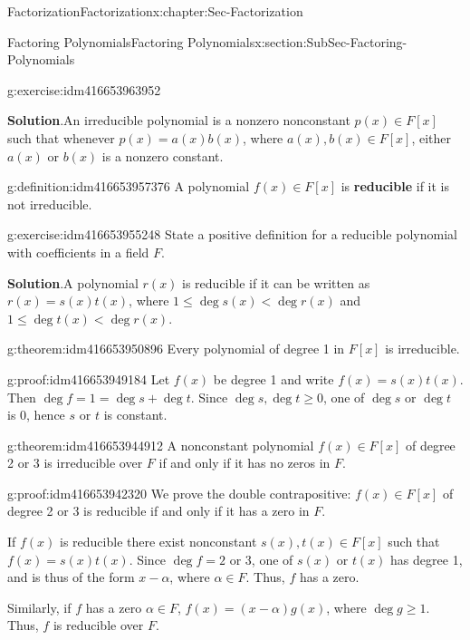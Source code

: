 \documentclass[oneside,10pt,]{book}
\newcommand{\terminology}[1]{\textbf{#1}}
\numberwithin{equation}{section}
\renewcommand{\le}{\leqslant}
\renewcommand{\ge}{\geqslant}
\newcommand{\lt}{<}
\begin{document}
\begin{chapterptx}{Factorization}{}{Factorization}{}{}{x:chapter:Sec-Factorization}
\begin{sectionptx}{Factoring Polynomials}{}{Factoring Polynomials}{}{}{x:section:SubSec-Factoring-Polynomials}
\begin{inlineexercise}{}{g:exercise:idm416653963952}
\par\smallskip%
\noindent\textbf{Solution}.\hypertarget{g:solution:idm416653960608}{}\quad{}An irreducible polynomial is a nonzero nonconstant \(p(x)\in F[x]\) such that whenever \(p(x) = a(x) b(x)\), where \(a(x), b(x) \in F[x]\), either \(a(x)\) or \(b(x)\) is a nonzero constant.%
\end{inlineexercise}
\begin{definition}{}{g:definition:idm416653957376}%
A polynomial \(f(x)\in F[x]\) is \terminology{reducible} if it is not irreducible.%
\end{definition}
\begin{inlineexercise}{}{g:exercise:idm416653955248}%
State a positive definition for a reducible polynomial with coefficients in a field \(F\).%
\par\smallskip%
\noindent\textbf{Solution}.\hypertarget{g:solution:idm416653953648}{}\quad{}A polynomial \(r(x)\) is reducible if it can be written as \(r(x) = s(x) t(x)\), where \(1 \le \deg s(x) \lt \deg r(x)\) and \(1 \le \deg t(x) \lt \deg r(x)\).%
\end{inlineexercise}
\begin{theorem}{}{}{g:theorem:idm416653950896}%
Every polynomial of degree 1 in \(F[x]\) is irreducible.%
\end{theorem}
\begin{proofptx}{}{g:proof:idm416653949184}
Let \(f(x)\) be degree 1 and write \(f(x) = s(x) t(x)\). Then \(\deg f = 1 = \deg s + \deg t\). Since \(\deg s, \deg t \ge 0\), one of \(\deg s\) or \(\deg t\) is 0, hence \(s\) or \(t\) is constant.%
\end{proofptx}
\begin{theorem}{}{}{g:theorem:idm416653944912}%
A nonconstant polynomial \(f(x)\in F[x]\) of degree 2 or 3 is irreducible over \(F\) if and only if it has no zeros in \(F\).%
\end{theorem}
\begin{proofptx}{}{g:proof:idm416653942320}
We prove the double contrapositive: \(f(x)\in F[x]\) of degree 2 or 3 is reducible if and only if it has a zero in \(F\).%
\par
If \(f(x)\) is reducible there exist nonconstant \(s(x),t(x)\in F[x]\) such that \(f(x) = s(x) t(x)\). Since \(\deg f = 2\) or 3, one of \(s(x)\) or \(t(x)\) has degree 1, and is thus of the form \(x-\alpha\), where \(\alpha \in F\). Thus, \(f\) has a zero.%
\par
Similarly, if \(f\) has a zero \(\alpha\in F\), \(f(x) = (x-\alpha)g(x)\), where \(\deg g \ge 1\). Thus, \(f\) is reducible over \(F\).%

\end{proofptx}
\end{sectionptx}
\end{chapterptx}
\end{document}
